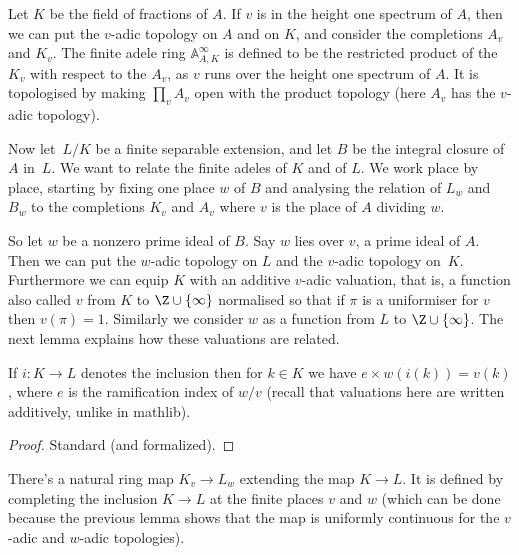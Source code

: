 Let $K$ be the field of fractions of $A$. If $v$ is in the height one spectrum of $A$,
then we can put the $v$-adic topology on $A$ and on $K$, and consider the completions
$A_v$ and $K_v$. The finite adele ring $\mathbb{A}_{A,K}^\infty$ is defined to be
the restricted product of the $K_v$ with respect to the $A_v$, as $v$ runs over
the height one spectrum of $A$. It is topologised by making $\prod_v A_v$ open with
the product topology (here $A_v$ has the $v$-adic topology).

Now let~$L/K$ be a finite separable extension, and let $B$ be the integral closure of~$A$ in~$L$.
We want to relate the finite adeles of $K$ and of $L$. We work place by place, starting by fixing
one place $w$ of $B$ and analysing the relation of $L_w$ and $B_w$ to the completions $K_v$
and $A_v$ where $v$ is the place of $A$ dividing $w$.

So let $w$ be a nonzero prime ideal of $B$. Say $w$ lies over $v$, a prime ideal of $A$.
Then we can put the $w$-adic topology on $L$ and the $v$-adic topology on~$K$. Furthermore
we can equip $K$ with an additive $v$-adic valuation, that is,
a function also called $v$ from $K$ to $\Z\cup\{\infty\}$ normalised so that if $\pi$ is a uniformiser
for $v$ then $v(\pi)=1$. Similarly we consider $w$ as a function from $L$ to $\Z\cup\{\infty\}$.
The next lemma explains how these valuations are related.

\begin{lemma}
  \label{IsDedekindDomain.HeightOneSpectrum.valuation_comap}
  \leanok
  If $i:K\to L$ denotes the inclusion then for $k\in K$ we have
  $e\times w(i(k))=v(k)$, where $e$ is the ramification index of $w/v$
  (recall that valuations here are written additively, unlike in mathlib).
\end{lemma}
\begin{proof}
  \leanok
  Standard (and formalized).
\end{proof}

\begin{definition}
  \label{IsDedekindDomain.HeightOneSpectrum.adicCompletionComapSemialgHom}
  \leanok
  There's a natural ring map $K_v\to L_w$ extending the map $K\to L$.
  It is defined by completing
  the inclusion $K\to L$ at the finite places $v$ and $w$ (which can be done
  because the previous lemma shows that the map is uniformly continuous for the $v$-adic
  and $w$-adic topologies).
\end{definition}

